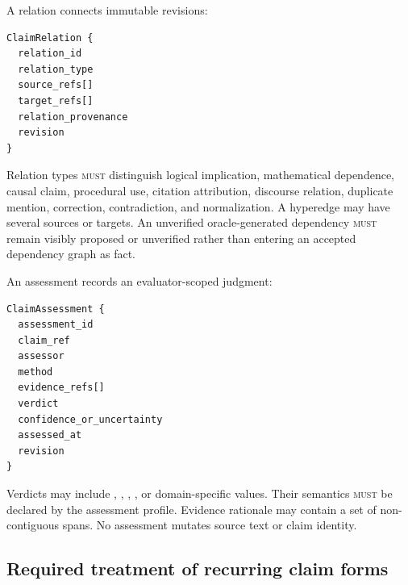 A relation connects immutable revisions:
\begin{lstlisting}[style=interface]
ClaimRelation {
  relation_id
  relation_type
  source_refs[]
  target_refs[]
  relation_provenance
  revision
}
\end{lstlisting}
Relation types \textsc{must} distinguish logical implication, mathematical dependence, causal claim, procedural use, citation attribution, discourse relation, duplicate mention, correction, contradiction, and normalization. A hyperedge may have several sources or targets. An unverified oracle-generated dependency \textsc{must} remain visibly proposed or unverified rather than entering an accepted dependency graph as fact.

An assessment records an evaluator-scoped judgment:
\begin{lstlisting}[style=interface]
ClaimAssessment {
  assessment_id
  claim_ref
  assessor
  method
  evidence_refs[]
  verdict
  confidence_or_uncertainty
  assessed_at
  revision
}
\end{lstlisting}
Verdicts may include , , , , or domain-specific values. Their semantics \textsc{must} be declared by the assessment profile. Evidence rationale may contain a set of non-contiguous spans. No assessment mutates source text or claim identity.

\subsection{Required treatment of recurring claim forms}


